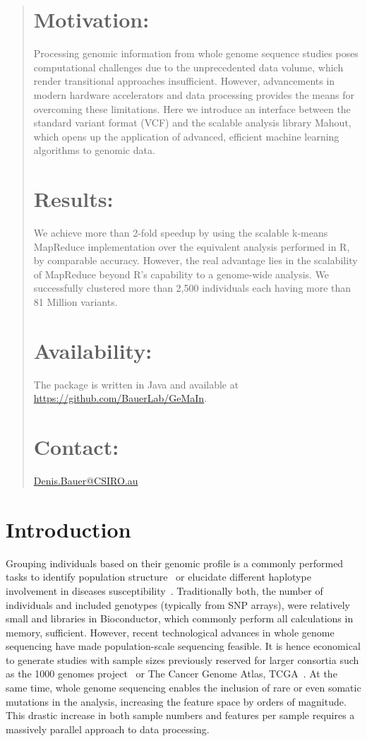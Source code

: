 \documentclass{bioinfo}
\begin{document}
\begin{abstract}

\section{Motivation:}
Processing genomic information from whole genome sequence studies poses computational challenges due to the unprecedented data volume, which render transitional approaches insufficient. 
However, advancements in modern hardware accelerators and data processing provides the means for overcoming these limitations. 
Here we introduce an interface between the standard variant format (VCF) and the scalable analysis library Mahout, which opens up the application of advanced, efficient machine learning algorithms to genomic data. 

\section{Results:}
We achieve more than 2-fold speedup by using the scalable k-means MapReduce implementation over the equivalent analysis performed in R, by comparable accuracy. However, the real advantage lies in the scalability of MapReduce beyond R's capability to a genome-wide analysis. We successfully clustered more than 2,500 individuals each having more than 81 Million variants. 
\section{Availability:}
The package is written in Java and available at \url{https://github.com/BauerLab/GeMaIn}.

\section{Contact:} \href{Denis.Bauer@CSIRO.au}{Denis.Bauer@CSIRO.au}
\end{abstract}

\section{Introduction}

Grouping individuals based on their genomic profile is a commonly performed tasks to identify population structure~\citep{Gao2007} or elucidate different haplotype involvement in diseases susceptibility~\citep{Laitman2013}.  
Traditionally both, the number of individuals and included genotypes (typically from SNP arrays), were relatively small and libraries in Bioconductor, which commonly perform all calculations in memory, sufficient. 
However, recent technological advances in whole genome sequencing have made population-scale sequencing feasible. 
It is hence economical to generate studies with sample sizes previously reserved for larger consortia such as the 1000 genomes project~\citep{1KG2012} or The Cancer Genome Atlas, TCGA~\citep{TCGA2013}. 
At the same time, whole genome sequencing enables the inclusion of rare or even somatic mutations in the analysis, increasing the feature space by orders of magnitude. This drastic increase in both sample numbers and features per sample requires a massively parallel approach to data processing. 
\end{document}
